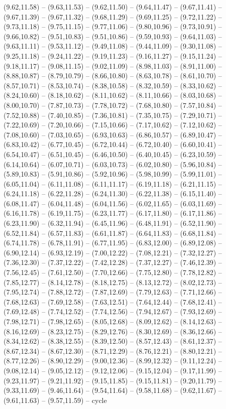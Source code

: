 \expandafter\def\csname geo:gebiet:DE-MV\endcsname{
  (9.62,11.58) -- (9.63,11.53) -- (9.62,11.50) -- (9.64,11.47) -- (9.67,11.41) -- (9.67,11.39) -- (9.67,11.32) -- (9.68,11.29) -- (9.69,11.25) -- (9.72,11.22) -- (9.73,11.18) -- (9.75,11.15) -- (9.77,11.06) -- (9.80,10.96) -- (9.73,10.91) -- (9.66,10.82) -- (9.51,10.83) -- (9.51,10.86) -- (9.59,10.93) -- (9.64,11.03) -- (9.63,11.11) -- (9.53,11.12) -- (9.49,11.08) -- (9.44,11.09) -- (9.30,11.08) -- (9.25,11.18) -- (9.24,11.22) -- (9.19,11.23) -- (9.16,11.27) -- (9.15,11.24) -- (9.18,11.17) -- (9.08,11.15) -- (9.02,11.09) -- (8.98,11.03) -- (8.91,11.00) -- (8.88,10.87) -- (8.79,10.79) -- (8.66,10.80) -- (8.63,10.78) -- (8.61,10.70) -- (8.57,10.71) -- (8.53,10.74) -- (8.38,10.58) -- (8.32,10.59) -- (8.33,10.62) -- (8.24,10.60) -- (8.18,10.62) -- (8.11,10.62) -- (8.11,10.66) -- (8.03,10.68) -- (8.00,10.70) -- (7.87,10.73) -- (7.78,10.72) -- (7.68,10.80) -- (7.57,10.84) -- (7.52,10.88) -- (7.40,10.85) -- (7.36,10.81) -- (7.35,10.75) -- (7.29,10.71) -- (7.22,10.69) -- (7.20,10.66) -- (7.15,10.66) -- (7.17,10.62) -- (7.12,10.62) -- (7.08,10.60) -- (7.03,10.65) -- (6.93,10.63) -- (6.86,10.57) -- (6.89,10.47) -- (6.83,10.42) -- (6.77,10.45) -- (6.72,10.44) -- (6.72,10.40) -- (6.60,10.41) -- (6.54,10.47) -- (6.51,10.45) -- (6.46,10.50) -- (6.40,10.45) -- (6.23,10.59) -- (6.14,10.64) -- (6.07,10.71) -- (6.03,10.73) -- (6.02,10.80) -- (5.96,10.84) -- (5.89,10.83) -- (5.91,10.86) -- (5.92,10.96) -- (5.98,10.99) -- (5.99,11.01) -- (6.05,11.04) -- (6.11,11.08) -- (6.11,11.17) -- (6.19,11.18) -- (6.21,11.15) -- (6.24,11.18) -- (6.22,11.28) -- (6.24,11.30) -- (6.22,11.38) -- (6.15,11.40) -- (6.08,11.47) -- (6.04,11.48) -- (6.04,11.56) -- (6.02,11.65) -- (6.03,11.69) -- (6.16,11.78) -- (6.19,11.75) -- (6.23,11.77) -- (6.17,11.80) -- (6.17,11.86) -- (6.23,11.90) -- (6.32,11.94) -- (6.45,11.96) -- (6.48,11.91) -- (6.52,11.90) -- (6.52,11.84) -- (6.57,11.83) -- (6.61,11.87) -- (6.64,11.83) -- (6.68,11.84) -- (6.74,11.78) -- (6.78,11.91) -- (6.77,11.95) -- (6.83,12.00) -- (6.89,12.08) -- (6.90,12.14) -- (6.93,12.19) -- (7.00,12.22) -- (7.08,12.21) -- (7.32,12.27) -- (7.36,12.30) -- (7.37,12.22) -- (7.42,12.28) -- (7.37,12.27) -- (7.46,12.39) -- (7.56,12.45) -- (7.61,12.50) -- (7.70,12.66) -- (7.75,12.80) -- (7.78,12.82) -- (7.85,12.77) -- (8.14,12.78) -- (8.18,12.75) -- (8.13,12.72) -- (8.02,12.73) -- (7.95,12.74) -- (7.88,12.72) -- (7.87,12.69) -- (7.79,12.63) -- (7.71,12.66) -- (7.68,12.63) -- (7.69,12.58) -- (7.63,12.51) -- (7.64,12.44) -- (7.68,12.41) -- (7.69,12.48) -- (7.74,12.52) -- (7.74,12.56) -- (7.94,12.67) -- (7.93,12.69) -- (7.98,12.71) -- (7.98,12.65) -- (8.05,12.68) -- (8.09,12.62) -- (8.14,12.63) -- (8.16,12.69) -- (8.23,12.75) -- (8.29,12.76) -- (8.30,12.69) -- (8.36,12.66) -- (8.34,12.62) -- (8.38,12.55) -- (8.39,12.50) -- (8.57,12.43) -- (8.61,12.37) -- (8.67,12.34) -- (8.67,12.30) -- (8.71,12.29) -- (8.76,12.21) -- (8.80,12.21) -- (8.77,12.26) -- (8.90,12.29) -- (9.00,12.36) -- (8.99,12.32) -- (9.11,12.24) -- (9.08,12.14) -- (9.05,12.12) -- (9.12,12.06) -- (9.15,12.04) -- (9.17,11.99) -- (9.23,11.97) -- (9.21,11.92) -- (9.15,11.85) -- (9.15,11.81) -- (9.20,11.79) -- (9.33,11.69) -- (9.46,11.64) -- (9.54,11.64) -- (9.58,11.68) -- (9.62,11.67) -- (9.61,11.63) -- (9.57,11.59) -- cycle
}

